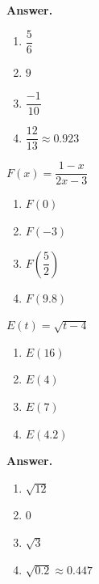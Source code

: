 \documentclass[10pt,]{book}
\theoremstyle{plain}
\theoremstyle{definition}
\theoremstyle{definition}
\theoremstyle{definition}
\theoremstyle{definition}
\numberwithin{equation}{part}
\begin{document}
\begin{exerciselist}
\begin{exercisegroup}
\noindent\textbf{Answer.}\hypertarget{answer-66}{}\quad
\leavevmode%
\begin{multicols}{2}
\begin{enumerate}[label=\alph*]
\item\hypertarget{li-433}{}\(\dfrac{5}{6} \)%
\item\hypertarget{li-434}{}\(9\)%
\item\hypertarget{li-435}{}\(\dfrac{-1}{10}\)%
\item\hypertarget{li-436}{}\(\dfrac{12}{13}\approx 0.923 \)%
\end{enumerate}
\end{multicols}
%
\exercise[46.]\hypertarget{exercise-115}{}\(F(x) = \dfrac{1-x}{2x-3}\) \leavevmode%
\begin{multicols}{2}
\begin{enumerate}[label=\alph*]
\item\hypertarget{li-437}{}\(F(0)\)%
\item\hypertarget{li-438}{}\(F(-3)\)%
\item\hypertarget{li-439}{}\(F\left(\dfrac{5}{2}\right)\)%
\item\hypertarget{li-440}{}\(F(9.8)\)%
\end{enumerate}
\end{multicols}
%
\exercise[47.]\hypertarget{exercise-116}{}\(E(t) =\sqrt{t-4}\) \leavevmode%
\begin{multicols}{2}
\begin{enumerate}[label=\alph*]
\item\hypertarget{li-441}{}\(E(16)\)%
\item\hypertarget{li-442}{}\(E(4)\)%
\item\hypertarget{li-443}{}\(E(7)\)%
\item\hypertarget{li-444}{}\(E(4.2)\)%
\end{enumerate}
\end{multicols}
%
\par\smallskip
\noindent\textbf{Answer.}\hypertarget{answer-67}{}\quad
\leavevmode%
\begin{multicols}{2}
\begin{enumerate}[label=\alph*]
\item\hypertarget{li-445}{}\(\sqrt{12} \)%
\item\hypertarget{li-446}{}\(0\)%
\item\hypertarget{li-447}{}\(\sqrt{3}\)%
\item\hypertarget{li-448}{}\(\sqrt{0.2}\approx 0.447 \)%
\end{enumerate}

\end{multicols}
\end{exercisegroup}
\end{exerciselist}
\end{document}

